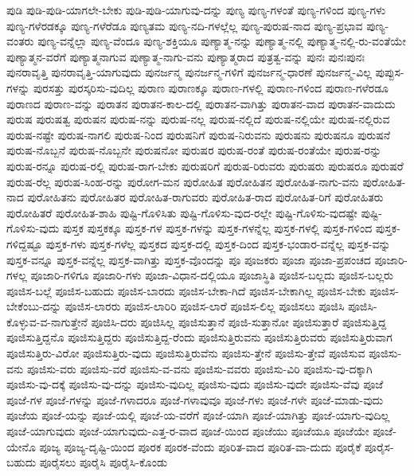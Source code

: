 {ಪುಡಿ
ಪುಡಿ-ಪುಡಿ-ಯಾಗಲೇ-ಬೇಕು
ಪುಡಿ-ಪುಡಿ-ಯಾಗುವು-ದನ್ನು
ಪುಣ್ಯ
ಪುಣ್ಯ-ಗಳಂತೆ
ಪುಣ್ಯ-ಗಳಿಂದ
ಪುಣ್ಯ-ಗಳು
ಪುಣ್ಯ-ಗಳೆರಡಕ್ಕೂ
ಪುಣ್ಯ-ಗಳೆರೆಡೂ
ಪುಣ್ಯತಮ
ಪುಣ್ಯ-ನದಿ-ಗಳಲ್ಲೆಲ್ಲ
ಪುಣ್ಯ-ಪುರುಷ-ನಾದ
ಪುಣ್ಯ-ಪ್ರಭಾವ
ಪುಣ್ಯ-ವಂತರು
ಪುಣ್ಯ-ವನ್ನೆಲ್ಲಾ
ಪುಣ್ಯ-ವೆಂದೂ
ಪುಣ್ಯ-ಶಕ್ತಿಯೂ
ಪುಣ್ಯಾತ್ಮ-ನನ್ನು
ಪುಣ್ಯಾತ್ಮ-ನಲ್ಲಿ
ಪುಣ್ಯಾತ್ಮ-ನಲ್ಲಿ-ರು-ವಂತೆಯೇ
ಪುಣ್ಯಾತ್ಮನ-ವರೆಗೆ
ಪುಣ್ಯಾತ್ಮನಾಗುವ
ಪುಣ್ಯಾತ್ಮ-ನಾಗು-ವನು
ಪುಣ್ಯಾತ್ಮರಾದ
ಪುತ್ರತ್ವ-ವನ್ನು
ಪುನಃ
ಪುನಃಪುನಃ
ಪುನರಾವೃತ್ತಿ
ಪುನರಾವೃತ್ತಿ-ಯಾಗುವುದು
ಪುನರ್ಜನ್ಮ
ಪುನರ್ಜನ್ಮ-ಗಳಿಗೆ
ಪುನರ್ಜನ್ಮ-ಧಾರಣೆ
ಪುನರ್ಜನ್ಮ-ವಿಲ್ಲ
ಪುಪ್ಪುಸ-ಗಳನ್ನು
ಪುರಸತ್ತು
ಪುರಸ್ಕರಿಸು-ವುದಿಲ್ಲ
ಪುರಾಣ
ಪುರಾಣಕ್ಕೂ
ಪುರಾಣ-ಗಳಲ್ಲಿ
ಪುರಾಣ-ಗಳಿಂದ
ಪುರಾಣ-ಗಳೆರಡೂ
ಪುರಾಣದ
ಪುರಾಣ-ವನ್ನು
ಪುರಾತನ
ಪುರಾತನ-ಕಾಲ-ದಲ್ಲಿ
ಪುರಾತನ-ವಾಗಿತ್ತು
ಪುರಾತನ-ವಾದ
ಪುರಾತನ-ವಾದುದು
ಪುರುಷ
ಪುರುಷತ್ವ
ಪುರುಷನ
ಪುರುಷ-ನನ್ನು
ಪುರುಷ-ನಲ್ಲ
ಪುರುಷ-ನಲ್ಲಿದೆ
ಪುರುಷ-ನಲ್ಲಿಯೇ
ಪುರುಷ-ನಲ್ಲಿರುವ
ಪುರುಷ-ನಷ್ಟೇ
ಪುರುಷ-ನಾಗಲಿ
ಪುರುಷ-ನಿಂದ
ಪುರುಷನಿಗೆ
ಪುರುಷ-ನಿರುವನು
ಪುರುಷನು
ಪುರುಷನೂ
ಪುರುಷನೆ
ಪುರುಷ-ನೊಬ್ಬನೆ
ಪುರುಷ-ನೊಬ್ಬನೇ
ಪುರುಷನೋ
ಪುರುಷರ
ಪುರುಷ-ರಂತೆ
ಪುರುಷ-ರಂತೆಯೇ
ಪುರುಷ-ರನ್ನು
ಪುರುಷ-ರನ್ನೂ
ಪುರುಷ-ರಲ್ಲಿ
ಪುರುಷ-ರಾಗ-ಬೇಕು
ಪುರುಷರಿಗೆ
ಪುರುಷ-ರಿರುವರು
ಪುರುಷರು
ಪುರುಷರೂ
ಪುರುಷರೆ
ಪುರುಷ-ರೆಲ್ಲ
ಪುರುಷ-ಸಿಂಹ-ರನ್ನು
ಪುರೋಗ-ಮನ
ಪುರೋಹಿತ
ಪುರೋಹಿತನ
ಪುರೋಹಿತ-ನಾಗು-ವನು
ಪುರೋಹಿತ-ನಾದ
ಪುರೋಹಿತನು
ಪುರೋಹಿತರ
ಪುರೋಹಿತ-ರಾಗುವರು
ಪುರೋಹಿತ-ರಾದ
ಪುರೋಹಿತ-ರಿಗೆ
ಪುರೋಹಿತರು
ಪುರೋಹಿತರೆ
ಪುರೋಹಿತ-ಶಾಹಿ
ಪುಷ್ಟಿ-ಗೊಳಿಸಿತು
ಪುಷ್ಟಿ-ಗೊಳಿಸು-ವುದ-ರಲ್ಲೇ
ಪುಷ್ಟಿ-ಗೊಳಿಸು-ವುದಷ್ಟೇ
ಪುಷ್ಟಿ-ಗೊಳಿಸು-ವುದು
ಪುಸ್ತಕ
ಪುಸ್ತಕಕ್ಕೂ
ಪುಸ್ತಕ-ಗಳ
ಪುಸ್ತಕ-ಗಳನ್ನು
ಪುಸ್ತಕ-ಗಳನ್ನೆಲ್ಲ
ಪುಸ್ತಕ-ಗಳಲ್ಲಿ
ಪುಸ್ತಕ-ಗಳಿಂದ
ಪುಸ್ತಕ-ಗಳಿದ್ದಷ್ಟೂ
ಪುಸ್ತಕ-ಗಳು
ಪುಸ್ತಕ-ಗಳೆಲ್ಲ
ಪುಸ್ತಕದ
ಪುಸ್ತಕ-ದಲ್ಲಿ
ಪುಸ್ತಕ-ದಿಂದ
ಪುಸ್ತಕ-ಭಂಡಾರ-ವನ್ನೆಲ್ಲ
ಪುಸ್ತಕ-ವನ್ನು
ಪುಸ್ತಕ-ವನ್ನೂ
ಪುಸ್ತಕ-ವನ್ನೆಲ್ಲ
ಪುಸ್ತಕ-ವಾಗಿತ್ತು
ಪುಸ್ತಕ-ವೊಂದನ್ನು
ಪೂ
ಪೂಜಕರು
ಪೂಜಾ
ಪೂಜಾ-ಪ್ರಪಂಚದ
ಪೂಜಾರಿ-ಗಳಲ್ಲ
ಪೂಜಾರಿ-ಗಳಿಗೂ
ಪೂಜಾರಿ-ಗಳು
ಪೂಜಾ-ವಿಧಾನ-ದಲ್ಲಿಯೂ
ಪೂಜಾಸ್ಥಿತಿ
ಪೂಜಿಸ-ಬಲ್ಲದು
ಪೂಜಿಸ-ಬಲ್ಲರು
ಪೂಜಿಸ-ಬಲ್ಲೆ
ಪೂಜಿಸ-ಬಹುದು
ಪೂಜಿಸ-ಬಾರದು
ಪೂಜಿಸ-ಬೇಕಾ-ಗಿದೆ
ಪೂಜಿಸ-ಬೇಕಾಗಿಲ್ಲ
ಪೂಜಿಸ-ಬೇಕು
ಪೂಜಿಸ-ಬೇಕೆಂಬು-ದನ್ನು
ಪೂಜಿಸ-ಲಾರರು
ಪೂಜಿಸ-ಲಾರಿರಿ
ಪೂಜಿಸ-ಲಾರೆ
ಪೂಜಿಸ-ಲಿಲ್ಲ
ಪೂಜಿಸಲು
ಪೂಜಿಸಿ
ಪೂಜಿಸಿ-ಕೊಳ್ಳುವ-ವ-ನಾಗುತ್ತೇನೆ
ಪೂಜಿಸಿ-ದರು
ಪೂಜಿಸಿಲ್ಲ
ಪೂಜಿಸುತ್ತಾನೆ
ಪೂಜಿ-ಸುತ್ತಾನೋ
ಪೂಜಿಸುತ್ತಾರೆ
ಪೂಜಿಸುತ್ತಿದ್ದ
ಪೂಜಿಸುತ್ತಿದ್ದನೊ
ಪೂಜಿಸುತ್ತಿದ್ದರು
ಪೂಜಿಸುತ್ತಿದ್ದ-ರೆಂದು
ಪೂಜಿಸುತ್ತಿರುವನು
ಪೂಜಿಸುತ್ತಿರುವರು
ಪೂಜಿಸುತ್ತಿರುವಾಗ
ಪೂಜಿಸುತ್ತಿರು-ವಿರೋ
ಪೂಜಿಸುತ್ತಿರು-ವುದು
ಪೂಜಿಸುತ್ತಿರುವೆನು
ಪೂಜಿಸು-ತ್ತೇನೆ
ಪೂಜಿಸು-ತ್ತೇವೆ
ಪೂಜಿಸುವ
ಪೂಜಿಸು-ವನು
ಪೂಜಿಸು-ವರು
ಪೂಜಿಸು-ವರೆ
ಪೂಜಿಸು-ವ-ವನು
ಪೂಜಿಸು-ವವರು
ಪೂಜಿಸು-ವಿರಿ
ಪೂಜಿಸು-ವು-ದಕ್ಕಾಗಿ
ಪೂಜಿಸು-ವು-ದಕ್ಕೆ
ಪೂಜಿಸು-ವು-ದನ್ನು
ಪೂಜಿಸು-ವುದಿಲ್ಲ
ಪೂಜಿಸು-ವುದು
ಪೂಜಿಸು-ವುದೇ
ಪೂಜಿಸು-ವೆವು
ಪೂಜೆ
ಪೂಜೆ-ಗಳ
ಪೂಜೆ-ಗಳನ್ನು
ಪೂಜೆ-ಗಳಾದರೂ
ಪೂಜೆ-ಗಳಾವುವೂ
ಪೂಜೆ-ಗಳು
ಪೂಜೆ-ಗಳೇ
ಪೂಜೆ-ಮಾಡು-ವುದು
ಪೂಜೆಯ
ಪೂಜೆ-ಯನ್ನು
ಪೂಜೆ-ಯಲ್ಲಿ
ಪೂಜೆ-ಯ-ವರೆಗೆ
ಪೂಜೆ-ಯಾಗಿ
ಪೂಜೆ-ಯಾಗಿತ್ತು
ಪೂಜೆ-ಯಾಗು-ವುದಿಲ್ಲ
ಪೂಜೆ-ಯಾಗುವುದು
ಪೂಜೆ-ಯಾಗುವುದು-ಎತ್ತ-ರ-ವಾದ
ಪೂಜೆ-ಯಿಂದ
ಪೂಜೆಯು
ಪೂಜೆಯೂ
ಪೂಜೆಯೇ
ಪೂಜೆ-ಯೇನೊ
ಪೂಜ್ಯ
ಪೂಜ್ಯ-ದೃಷ್ಟಿ-ಯಿಂದ
ಪೂರಕ
ಪೂರಕ-ವೆಂದು
ಪೂರಿತ-ವಾದ
ಪೂರಿತ-ವಾ-ದುದು
ಪೂರೈಕೆ
ಪೂರೈಸ-ಬಹುದು
ಪೂರೈಸಲು
ಪೂರೈಸಿ
ಪೂರೈಸಿ-ಕೊಂಡು
}
